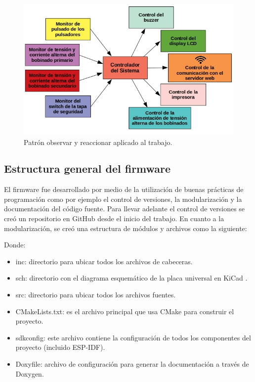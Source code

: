 \begin{figure}[htpb]
	\centering
	\includegraphics[scale=0.55]{./Figures/arquitecturaSoft.jpg}
	\caption{Patrón observar y reaccionar aplicado al trabajo.}
	\label{fig:patronAplicado}
\end{figure}



\subsection{Estructura general del firmware}

El firmware fue desarrollado por medio de la utilización de buenas prácticas de programación como por ejemplo el control de versiones, la modularización y la documentación del código fuente. Para llevar adelante el control de versiones se creó un repositorio en GitHub \citep{TP_CESE} desde el inicio del trabajo. En cuanto a la modularización, se creó una estructura de módulos y archivos como la siguiente:


Donde: 
\begin{itemize}
\item inc: directorio para ubicar todos los archivos de cabeceras.
\item sch: directorio con el diagrama esquemático de la placa universal en KiCad \citep{KICAD}.
\item src: directorio para ubicar todos los archivos fuentes.
\item CMakeLists.txt: es el archivo principal que usa CMake para construir el proyecto.
\item sdkconfig: este archivo contiene la configuración de todos los componentes del proyecto (incluido ESP-IDF).
\item Doxyfile: archivo de configuración para generar la documentación a través de Doxygen.
\end{itemize}

